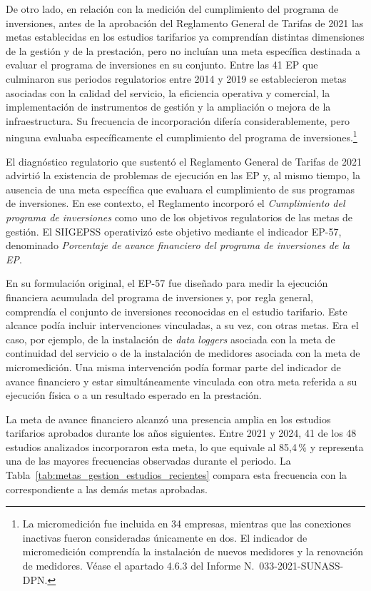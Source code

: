 De otro lado, en relación con la medición del cumplimiento del programa de inversiones, antes de la aprobación del Reglamento General de Tarifas de 2021 las metas establecidas en los estudios tarifarios ya comprendían distintas dimensiones de la gestión y de la prestación, pero no incluían una meta específica destinada a evaluar el programa de inversiones en su conjunto. Entre las 41 EP que culminaron sus periodos regulatorios entre 2014 y 2019 se establecieron metas asociadas con la calidad del servicio, la eficiencia operativa y comercial, la implementación de instrumentos de gestión y la ampliación o mejora de la infraestructura. Su frecuencia de incorporación difería considerablemente, pero ninguna evaluaba específicamente el cumplimiento del programa de inversiones.\footnote{La micromedición fue incluida en 34 empresas, mientras que las conexiones inactivas fueron consideradas únicamente en dos. El indicador de micromedición comprendía la instalación de nuevos medidores y la renovación de medidores. Véase el apartado 4.6.3 del Informe N.\textdegree~033-2021-SUNASS-DPN.}

El diagnóstico regulatorio que sustentó el Reglamento General de Tarifas de 2021 advirtió la existencia de problemas de ejecución en las EP y, al mismo tiempo, la ausencia de una meta específica que evaluara el cumplimiento de sus programas de inversiones. En ese contexto, el Reglamento incorporó el \textit{Cumplimiento del programa de inversiones} como uno de los objetivos regulatorios de las metas de gestión. El SIIGEPSS operativizó este objetivo mediante el indicador EP-57, denominado \textit{Porcentaje de avance financiero del programa de inversiones de la EP}.

En su formulación original, el EP-57 fue diseñado para medir la ejecución financiera acumulada del programa de inversiones y, por regla general, comprendía el conjunto de inversiones reconocidas en el estudio tarifario. Este alcance podía incluir intervenciones vinculadas, a su vez, con otras metas. Era el caso, por ejemplo, de la instalación de \textit{data loggers} asociada con la meta de continuidad del servicio o de la instalación de medidores asociada con la meta de micromedición. Una misma intervención podía formar parte del indicador de avance financiero y estar simultáneamente vinculada con otra meta referida a su ejecución física o a un resultado esperado en la prestación.

La meta de avance financiero alcanzó una presencia amplia en los estudios tarifarios aprobados durante los años siguientes. Entre 2021 y 2024, 41 de los 48 estudios analizados incorporaron esta meta, lo que equivale al 85,4\,\% y representa una de las mayores frecuencias observadas durante el periodo. La Tabla~\ref{tab:metas_gestion_estudios_recientes} compara esta frecuencia con la correspondiente a las demás metas aprobadas.

